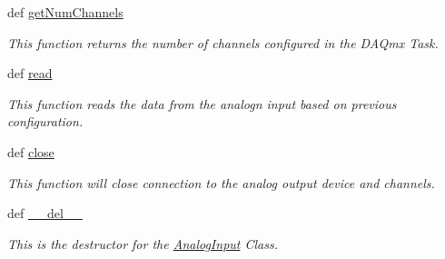 \begin{DoxyCompactItemize}
def \hyperlink{class_chassis_8git_1_1_analog_input_1_1_analog_input_a841c957f25e3cf82bb390a35fcbf5d72}{get\-Num\-Channels}
\begin{DoxyCompactList}\small\item\em This function returns the number of channels configured in the D\-A\-Qmx Task. \end{DoxyCompactList}\item 
def \hyperlink{class_chassis_8git_1_1_analog_input_1_1_analog_input_a198cef4c00c8793142ef5008ff4235ee}{read}
\begin{DoxyCompactList}\small\item\em This function reads the data from the analogn input based on previous configuration. \end{DoxyCompactList}\item 
def \hyperlink{class_chassis_8git_1_1_analog_input_1_1_analog_input_a9a52ffa6a82581ae429e229af5fb64a5}{close}
\begin{DoxyCompactList}\small\item\em This function will close connection to the analog output device and channels. \end{DoxyCompactList}\item 
def \hyperlink{class_chassis_8git_1_1_analog_input_1_1_analog_input_ab8221e5be371274b4278717899d8c6e9}{\-\_\-\-\_\-del\-\_\-\-\_\-}
\begin{DoxyCompactList}\small\item\em This is the destructor for the \hyperlink{class_chassis_8git_1_1_analog_input_1_1_analog_input}{Analog\-Input} Class. \end{DoxyCompactList}\end{DoxyCompactItemize}
